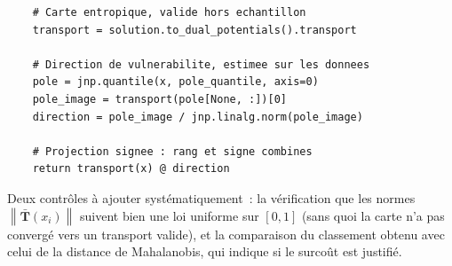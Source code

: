\documentclass[11pt,a4paper]{article}
\theoremstyle{definition}
\theoremstyle{remark}
\newcommand{\norm}[1]{\left\lVert #1 \right\rVert}
\newcommand{\Tmap}{\mathbf{T}}
\begin{document}
\begin{lstlisting}
    # Carte entropique, valide hors echantillon
    transport = solution.to_dual_potentials().transport

    # Direction de vulnerabilite, estimee sur les donnees
    pole = jnp.quantile(x, pole_quantile, axis=0)
    pole_image = transport(pole[None, :])[0]
    direction = pole_image / jnp.linalg.norm(pole_image)

    # Projection signee : rang et signe combines
    return transport(x) @ direction
\end{lstlisting}

\noindent
Deux contrôles à ajouter systématiquement~: la vérification que les normes
$\norm{\bar{\Tmap}(x_i)}$ suivent bien une loi uniforme sur $[0,1]$ (sans quoi la carte n'a pas
convergé vers un transport valide), et la comparaison du classement obtenu avec celui de la
distance de Mahalanobis, qui indique si le surcoût est justifié.
\end{document}
